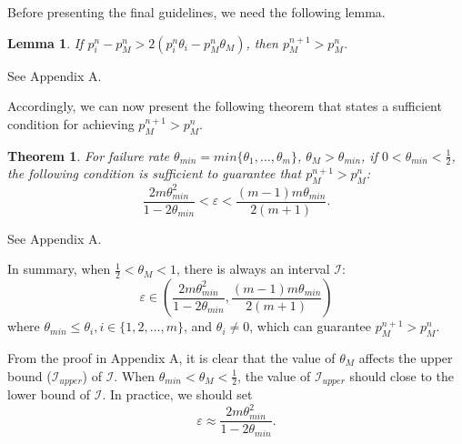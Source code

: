 \documentclass[10pt,journal,compsoc]{IEEEtran}
\begin{document}
Before presenting the final guidelines, we need the following lemma.
\newtheorem{lem}{Lemma}
\label{Lemma}
\begin{lem}
  If $p_i^{n} - p_M^{n} > 2(p_i^{n}\theta_i - p_M^{n}\theta_M)$, then $p_M^{n + 1} > p_M^{n}$.
\end{lem}
\begin{IEEEproof}
See Appendix A.
\end{IEEEproof}

\vspace{1ex} 
Accordingly, we can now present the following theorem that states a sufficient condition for achieving $p_M^{n + 1} > p_M^{n}$.
\newtheorem{theo}{Theorem}
\label{theorem}
\begin{theo}
  For failure rate $\theta_{min} = min\{\theta_1, \ldots, \theta_m\}$, $\theta_M > \theta_{min}$, if $0 < \theta_{min} < \frac{1}{2}$, the following condition is sufficient to guarantee that $p_M^{n + 1} > p_M^{n}$:
\begin{equation}
\label{equa:results}
  \displaystyle\frac{2m\theta_{min}^2}{1-2\theta_{min}} < \varepsilon < \displaystyle\frac{(m-1)m\theta_{min}}{2(m + 1)}.
\end{equation}
\end{theo}
\begin{IEEEproof}
See Appendix A.
\end{IEEEproof}

\vspace{1ex} 
In summary, when $\frac{1}{2} < \theta_M < 1$, there is always an interval $\mathcal{I}$:
\begin{equation}
  \varepsilon \in (\displaystyle\frac{2m\theta_{min}^2}{1 - 2\theta_{min}}, \displaystyle\frac{(m - 1)m\theta_{min}}{2(m + 1)})
\end{equation}
where $\theta_{min} \le \theta_i, i \in \{1, 2, \ldots, m\}$, and $\theta_i \ne 0$, which can guarantee $p_M^{n+1} > p_M^n$.

\vspace{1ex} 
From the proof in Appendix A, it is clear that the value of $\theta_M$ affects the upper bound ($\mathcal{I}_{upper}$) of $\mathcal{I}$.
When $\theta_{min} < \theta_M < \frac{1}{2}$, the value of $\mathcal{I}_{upper}$ should close to the lower bound of $\mathcal{I}$.
In practice, we should set
\begin{equation}
\label{euqtion:approxValue}
  \varepsilon \approx \frac{2m\theta_{min}^2}{1-2\theta_{min}}.
\end{equation}
\end{document}
